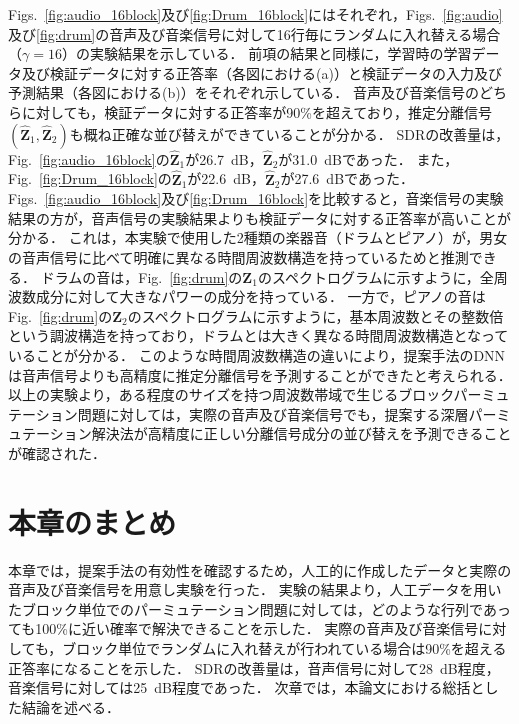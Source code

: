 Figs.~\ref{fig:audio_16block}及び\ref{fig:Drum_16block}にはそれぞれ，Figs.~\ref{fig:audio}及び\ref{fig:drum}の音声及び音楽信号に対して16行毎にランダムに入れ替える場合（$\gamma=16$）の実験結果を示している．
前項の結果と同様に，学習時の学習データ及び検証データに対する正答率（各図における(a)）と検証データの入力及び予測結果（各図における(b)）をそれぞれ示している．
音声及び音楽信号のどちらに対しても，検証データに対する正答率が90\%を超えており，推定分離信号$(\hat{\bm{Z}}_1, \hat{\bm{Z}}_2)$も概ね正確な並び替えができていることが分かる．
SDRの改善量は，Fig.~\ref{fig:audio_16block}の$\hat{\bm{Z}}_1$が26.7~dB，$\hat{\bm{Z}}_2$が31.0~dBであった．
また，Fig.~\ref{fig:Drum_16block}の$\hat{\bm{Z}}_1$が22.6~dB，$\hat{\bm{Z}}_2$が27.6~dBであった．
Figs.~\ref{fig:audio_16block}及び\ref{fig:Drum_16block}を比較すると，音楽信号の実験結果の方が，音声信号の実験結果よりも検証データに対する正答率が高いことが分かる．
これは，本実験で使用した2種類の楽器音（ドラムとピアノ）が，男女の音声信号に比べて明確に異なる時間周波数構造を持っているためと推測できる．
ドラムの音は，Fig.~\ref{fig:drum}の$\bm{Z}_1$のスペクトログラムに示すように，全周波数成分に対して大きなパワーの成分を持っている．
一方で，ピアノの音はFig.~\ref{fig:drum}の$\bm{Z}_2$のスペクトログラムに示すように，基本周波数とその整数倍という調波構造を持っており，ドラムとは大きく異なる時間周波数構造となっていることが分かる．
このような時間周波数構造の違いにより，提案手法のDNNは音声信号よりも高精度に推定分離信号を予測することができたと考えられる．
以上の実験より，ある程度のサイズを持つ周波数帯域で生じるブロックパーミュテーション問題に対しては，実際の音声及び音楽信号でも，提案する深層パーミュテーション解決法が高精度に正しい分離信号成分の並び替えを予測できることが確認された．

\clearpage
\section{本章のまとめ}
\label{sec:matome}
本章では，提案手法の有効性を確認するため，人工的に作成したデータと実際の音声及び音楽信号を用意し実験を行った．
実験の結果より，人工データを用いたブロック単位でのパーミュテーション問題に対しては，どのような行列であっても100\%に近い確率で解決できることを示した．
実際の音声及び音楽信号に対しても，ブロック単位でランダムに入れ替えが行われている場合は90\%を超える正答率になることを示した．
SDRの改善量は，音声信号に対して28~dB程度，音楽信号に対しては25~dB程度であった．
次章では，本論文における総括とした結論を述べる．
